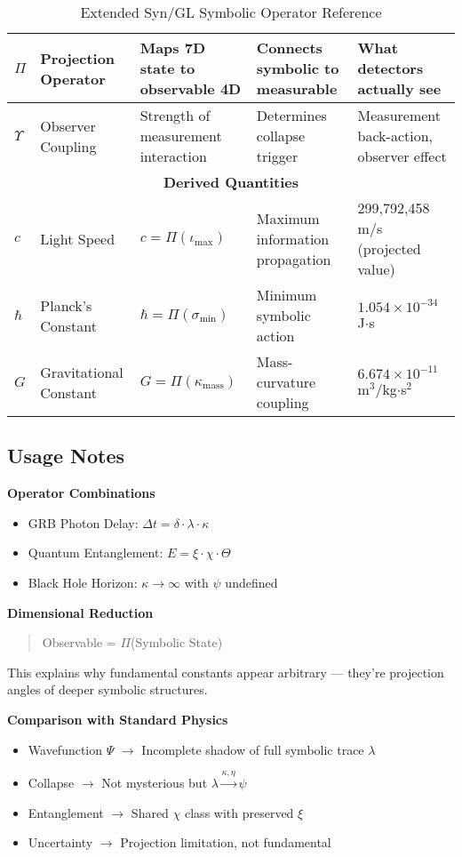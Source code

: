 \documentclass[11pt]{article}
\begin{document}
\begin{table}[H]
\begin{tabular}{|p{1.5cm}|p{3cm}|p{4cm}|p{4cm}|p{4cm}|}
\hline
$\Pi$ & Projection Operator & Maps 7D state to observable 4D & Connects symbolic to measurable & What detectors actually see \\
\hline
$\Upsilon$ & Observer Coupling & Strength of measurement interaction & Determines collapse trigger & Measurement back-action, observer effect \\
\hline
\multicolumn{5}{|c|}{\textbf{Derived Quantities}} \\
\hline
$c$ & Light Speed & $c = \Pi(\iota_{\text{max}})$ & Maximum information propagation & 299,792,458 m/s (projected value) \\
\hline
$\hbar$ & Planck's Constant & $\hbar = \Pi(\sigma_{\text{min}})$ & Minimum symbolic action & $1.054 \times 10^{-34}$ J$\cdot$s \\
\hline
$G$ & Gravitational Constant & $G = \Pi(\kappa_{\text{mass}})$ & Mass-curvature coupling & $6.674 \times 10^{-11}$ m$^3$/kg$\cdot$s$^2$ \\
\hline
\end{tabular}
\caption{Extended Syn/GL Symbolic Operator Reference}
\end{table}

\subsection*{Usage Notes}

\textbf{Operator Combinations}
\begin{itemize}
\item GRB Photon Delay: $\Delta t = \delta \cdot \lambda \cdot \kappa$
\item Quantum Entanglement: $E = \xi \cdot \chi \cdot \Theta$
\item Black Hole Horizon: $\kappa \rightarrow \infty$ with $\psi$ undefined
\end{itemize}

\textbf{Dimensional Reduction}
\begin{quote}
Observable = $\Pi$(Symbolic State)
\end{quote}
This explains why fundamental constants appear arbitrary — they're projection angles of deeper symbolic structures.

\textbf{Comparison with Standard Physics}
\begin{itemize}
\item Wavefunction $\Psi$ $\rightarrow$ Incomplete shadow of full symbolic trace $\lambda$
\item Collapse $\rightarrow$ Not mysterious but $\lambda \xrightarrow{\kappa,\eta} \psi$
\item Entanglement $\rightarrow$ Shared $\chi$ class with preserved $\xi$
\item Uncertainty $\rightarrow$ Projection limitation, not fundamental
\end{itemize}
\end{document}
